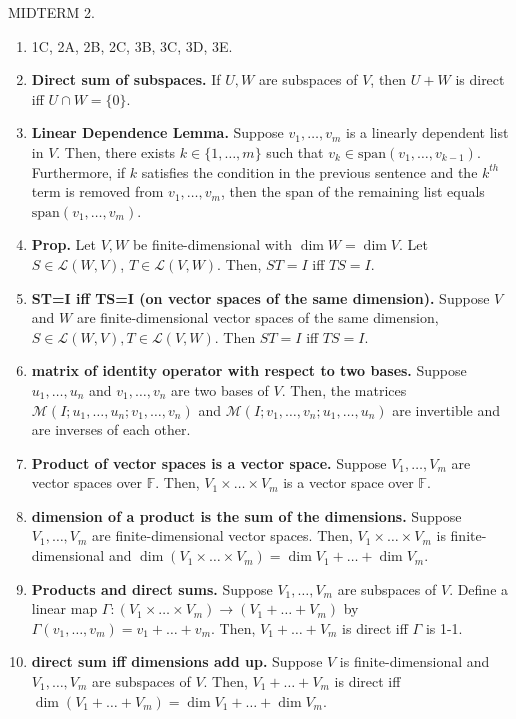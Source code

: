 MIDTERM 2. 
\begin{enumerate}
	\item 1C, 2A, 2B, 2C, 3B, 3C, 3D, 3E. 
	\item \textbf{Direct sum of subspaces. } If $U,W$ are subspaces of $V$, then $U + W$ is direct iff $U \cap W = \{0\}$. 	
	\item \textbf{Linear Dependence Lemma. } Suppose $v_1,\dots,v_m$ is a linearly dependent list in $V$. Then, there exists $k \in \{1,\dots,m\}$ such that $v_k \in \textrm{span}(v_1,\dots,v_{k-1})$. Furthermore, if $k$ satisfies the condition in the previous sentence and the $k^{th}$ term is removed from $v_1,\dots,v_m$, then the span of the remaining list equals $\textrm{span}(v_1,\dots,v_m)$. 
	\item \textbf{Prop. } Let $V,W$ be finite-dimensional with $\dim W = \dim V$. Let $S \in \mathscr{L}(W,V)$, $T \in \mathscr{L}(V,W)$. Then, $ST=I$ iff $TS=I$. 
	\item \textbf{ST=I iff TS=I (on vector spaces of the same dimension). } Suppose $V$ and $W$ are finite-dimensional vector spaces of the same dimension, $S \in \mathscr{L}(W,V), T \in \mathscr{L}(V,W)$. Then $ST=I$ iff $TS=I$. 
	\item \textbf{matrix of identity operator with respect to two bases. } Suppose $u_1,\dots,u_n$ and $v_1,\dots,v_n$ are two bases of $V$. Then, the matrices $\mathscr{M}(I; u_1,\dots,u_n; v_1,\dots,v_n)$ and $\mathscr{M}(I; v_1,\dots,v_n; u_1,\dots,u_n)$ are invertible and are inverses of each other. 
	\item \textbf{Product of vector spaces is a vector space. } Suppose $V_1,\dots,V_m$ are vector spaces over $\mathbb{F}$. Then, $V_1 \times \dots \times V_m$ is a vector space over $\mathbb{F}$. 
	\item \textbf{dimension of a product is the sum of the dimensions. } Suppose $V_1,\dots,V_m$ are finite-dimensional vector spaces. Then, $V_1 \times \dots \times V_m$ is finite-dimensional and $\dim(V_1 \times \dots \times V_m) = \dim V_1 + \dots + \dim V_m$. 
	\item \textbf{Products and direct sums. } Suppose $V_1,\dots,V_m$ are subspaces of $V$. Define a linear map $\Gamma: (V_1 \times \dots \times V_m) \to (V_1 + \dots + V_m)$ by $\Gamma(v_1,\dots,v_m) = v_1 + \dots + v_m$. Then, $V_1 + \dots + V_m$ is direct iff $\Gamma$ is 1-1. 
	\item \textbf{direct sum iff dimensions add up. } Suppose $V$ is finite-dimensional and $V_1,\dots,V_m$ are subspaces of $V$. Then, $V_1 + \dots + V_m$ is direct iff $\dim(V_1 + \dots + V_m) = \dim V_1 + \dots + \dim V_m$. 

\end{enumerate}
